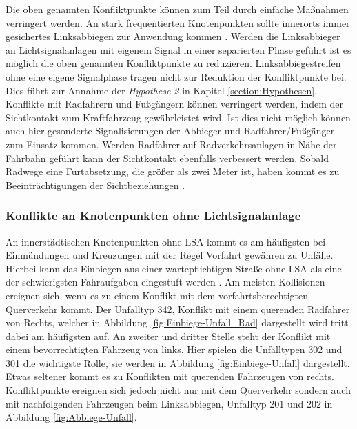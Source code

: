 Die oben genannten Konfliktpunkte können zum Teil durch einfache Maßnahmen verringert werden. An stark frequentierten Knotenpunkten sollte innerorts immer gesichertes Linksabbiegen zur Anwendung kommen \parencite[S. 275]{Schreiber.2016}. Werden die Linksabbieger an Lichtsignalanlagen mit eigenem Signal in einer separierten Phase geführt ist es möglich die oben genannten Konfliktpunkte zu reduzieren. Linksabbiegestreifen ohne eine eigene Signalphase tragen nicht zur Reduktion der Konfliktpunkte bei. Dies führt zur Annahme der \textit{Hypothese 2} in Kapitel \ref{section:Hypothesen}. Konflikte mit Radfahrern und Fußgängern können verringert werden, indem der Sichtkontakt zum Kraftfahrzeug gewährleistet wird. Ist dies nicht möglich können auch hier gesonderte Signalisierungen der Abbieger und Radfahrer/Fußgänger zum Einsatz kommen. Werden Radfahrer auf Radverkehrsanlagen in Nähe der Fahrbahn geführt kann der Sichtkontakt ebenfalls verbessert werden. Sobald Radwege eine Furtabsetzung, die größer als zwei Meter ist, haben kommt es zu Beeinträchtigungen der Sichtbeziehungen \parencite[S. 276f]{Schreiber.2016}.

\subsubsection{Konflikte an Knotenpunkten ohne Lichtsignalanlage}\label{chapter:Knotenpunkte ohne LSA}
An innerstädtischen Knotenpunkten ohne \ac{LSA} kommt es am häufigsten bei Einmündungen und Kreuzungen mit der Regel Vorfahrt gewähren zu Unfälle. Hierbei kann das Einbiegen aus einer wartepflichtigen Straße ohne \ac{LSA} als eine der schwierigsten Fahraufgaben eingestuft werden \parencite[S. 90]{Reichart.2001}. Am meisten Kollisionen ereignen sich, wenn es zu einem Konflikt mit dem vorfahrtsberechtigten Querverkehr kommt. Der Unfalltyp 342, Konflikt mit einem querenden Radfahrer von Rechts, welcher in Abbildung \ref{fig:Einbiege-Unfall_Rad} dargestellt wird tritt dabei am häufigsten auf. An zweiter und dritter Stelle steht der Konflikt mit einem bevorrechtigten Fahrzeug von links. Hier spielen die Unfalltypen 302 und 301 die wichtigste Rolle, sie werden in Abbildung \ref{fig:Einbiege-Unfall} dargestellt. Etwas seltener kommt es zu Konflikten mit querenden Fahrzeugen von rechts. Konfliktpunkte ereignen sich jedoch nicht nur mit dem Querverkehr sondern auch mit nachfolgenden Fahrzeugen beim Linksabbiegen, Unfalltyp 201 und 202 in Abbildung \ref{fig:Abbiege-Unfall}.

